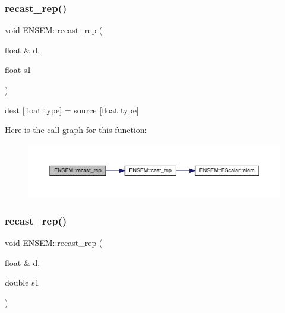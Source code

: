 \subsubsection{\texorpdfstring{recast\_rep()}{recast\_rep()}\hspace{0.1cm}{\footnotesize\ttfamily [2/6]}}
{\footnotesize\ttfamily void E\+N\+S\+E\+M\+::recast\+\_\+rep (\begin{DoxyParamCaption}\item[{float \&}]{d,  }\item[{float}]{s1 }\end{DoxyParamCaption})\hspace{0.3cm}{\ttfamily [inline]}}



dest \mbox{[}float type\mbox{]} = source \mbox{[}float type\mbox{]} 

Here is the call graph for this function\+:\nopagebreak
\begin{figure}[H]
\begin{center}
\leavevmode
\includegraphics[width=350pt]{dd/d99/group__simpleword_ga9a35d7bf3c8e7160728164e4d077eb4f_cgraph}
\end{center}
\end{figure}
\mbox{\label{group__simpleword_gad3aa40e2f2b149a85e571f6c4d757bac}} 
\subsubsection{\texorpdfstring{recast\_rep()}{recast\_rep()}\hspace{0.1cm}{\footnotesize\ttfamily [3/6]}}
{\footnotesize\ttfamily void E\+N\+S\+E\+M\+::recast\+\_\+rep (\begin{DoxyParamCaption}\item[{float \&}]{d,  }\item[{double}]{s1 }\end{DoxyParamCaption})\hspace{0.3cm}{\ttfamily [inline]}}



